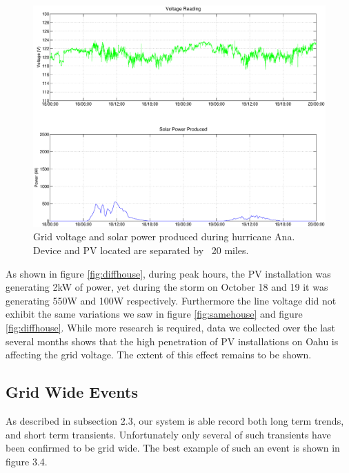\begin{figure}[h!]
\centering
\includegraphics[width=\textwidth]{img/Stormy.eps}
\caption{Grid voltage and solar power produced during hurricane Ana. Device and PV located are separated by ~20 miles.}
\label{fig:storm}
\end{figure} 

As shown in figure \ref{fig:diffhouse}, during peak hours, the PV installation  was generating 2kW of power, yet during the storm on October 18 and 19 it was generating 550W and 100W respectively. Furthermore
the line voltage did not exhibit the same variations we saw in figure \ref{fig:samehouse} and figure \ref{fig:diffhouse}. While more research is required, data we collected over the last several months shows that the
high penetration of PV installations on Oahu is affecting the grid voltage. The extent of this effect remains to be shown.

\subsection{Grid Wide Events}

As described in subsection 2.3, our system is able record both long term trends, and short term transients. Unfortunately only several of such transients have been confirmed to be grid wide.
The best example of such an event is shown in figure 3.4.


